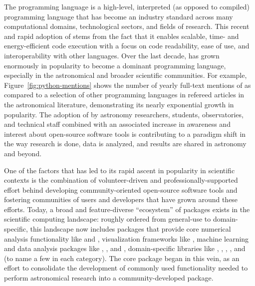 \documentclass[modern]{aastex631}
\newcommand{\secauthor}[1]{{\color{blue}Author:~\textit{#1}}}
\begin{document}

The \python programming language is a high-level, interpreted (as opposed to
compiled) programming language that has become an industry standard across many
computational domains, technological sectors, and fields of research.
This recent and rapid adoption of \python stems from the fact that it enables
scalable, time- and energy-efficient code execution \citep[e.g.,][]{Augier:2021}
with a focus on code readability, ease of use, and interoperability with other
languages.
Over the last decade, \python has grown enormously in popularity to become a
dominant programming language, especially in the astronomical and broader scientific
communities.
For example, Figure~\ref{fig:python-mentions} shows the number of yearly
full-text mentions of \python as compared to a selection of other programming languages
in refereed articles in the astronomical literature, demonstrating its nearly
exponential growth in popularity.
The adoption of \python by astronomy researchers, students, observatories, and
technical staff combined with an associated increase in awareness and interest
about open-source software tools is contributing to a paradigm shift in the way
research is done, data is analyzed, and results are shared in astronomy and
beyond.

One of the factors that has led to its rapid ascent in popularity in scientific
contexts is the combination of volunteer-driven and professionally-supported
effort behind developing community-oriented open-source software tools and
fostering communities of users and developers that have grown around these
efforts.
Today, a broad and feature-diverse ``ecosystem'' of packages exists in the
\python scientific computing landscape: roughly ordered from general-use to
domain-specific, this landscape now includes packages that provide core
numerical analysis functionality like  \citep{numpy:nature} and
 \citep{scipy}, visualization frameworks like
 \citep{matplotlib}, machine learning and data analysis
packages like  \citep{tensorflow}, 
\citep{Salvatier:2016}, and  \citep{emcee}, domain-specific
libraries like  \citep{yt:2011}, 
\citep{plasmapy},  \citep{sunpy:apj}, 
\citep{biopython}, and  \citep{sympy} (to name a few in each
category).
The \astropypkg \citep{astropy:2013, astropy:2018} core package began in this
vein, as an effort to consolidate the development of commonly used functionality
needed to perform astronomical research into a community-developed \python
package.
\end{document}
